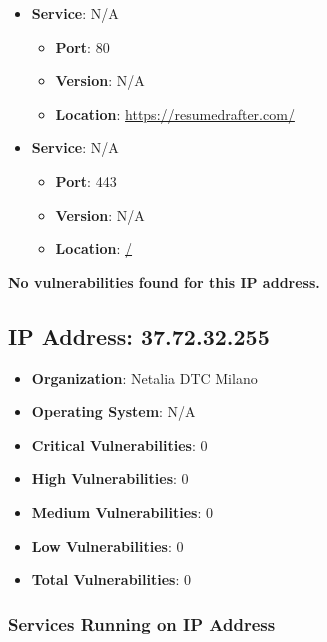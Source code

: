 \documentclass{article}
\begin{document}
\begin{itemize}
    
        \item \textbf{Service}: N/A
        \begin{itemize}
            \item \textbf{Port}: 80
            \item \textbf{Version}:  N/A 
            \item \textbf{Location}: \href{ https://resumedrafter.com/ }{ https://resumedrafter.com/ }
        \end{itemize}
    
        \item \textbf{Service}: N/A
        \begin{itemize}
            \item \textbf{Port}: 443
            \item \textbf{Version}:  N/A 
            \item \textbf{Location}: \href{ / }{ / }
        \end{itemize}
    
\end{itemize}


\textbf{No vulnerabilities found for this IP address.}




\clearpage



\subsection{IP Address: 37.72.32.255}

\begin{itemize}
    \item \textbf{Organization}: Netalia DTC Milano
    \item \textbf{Operating System}:  N/A 
    \item \textbf{Critical Vulnerabilities}: 0
    \item \textbf{High Vulnerabilities}: 0
    \item \textbf{Medium Vulnerabilities}: 0
    \item \textbf{Low Vulnerabilities}: 0
    \item \textbf{Total Vulnerabilities}: 0
\end{itemize}

\subsubsection*{Services Running on IP Address}
\end{document}

